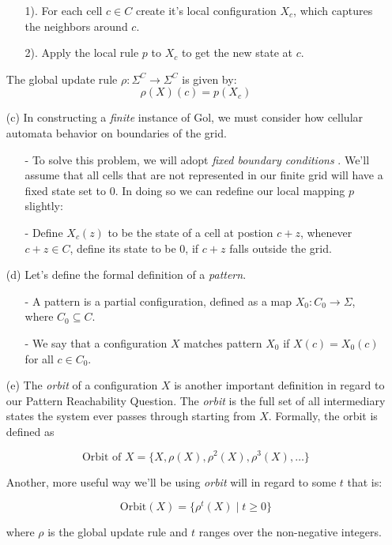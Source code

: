 \documentclass{article}
\theoremstyle{definition}
\theoremstyle{plain}
\theoremstyle{plain}
\begin{document}
\begin{enumerate}
        \begin{enumerate}
          \item[1).] For each cell $c \in C$ create it's local configuration $X_c$, which captures the neighbors around $c$.
          \item[2).] Apply the local rule $p$ to $X_c$ to get the new state at $c$.
        \end{enumerate}
        The global update rule $\rho : \Sigma^C \to \Sigma^C$ is  given by:
        \begin {equation}
        \rho(X)(c) = p(X_c)
        \end {equation}
      \item[(c)] In constructing a \textit{finite} instance of Gol, we must consider how cellular automata behavior on boundaries of the grid.
        \begin{enumerate}
          \item[-] To solve this problem, we will adopt \textit{fixed boundary conditions} \cite{SUTNER199587}. We'll assume that all cells that are not represented in our finite grid will have a fixed state set to $0$. In doing so we can redefine our local mapping $p$ slightly: 
          \item[-] Define $X_c(z)$ to be the state of a cell at postion $c + z$, whenever $c + z \in C$, define its state to be 0, if $c + z$ falls outside the grid.
        \end{enumerate}
      \item[(d)] Let's define the formal definition of a \textit{pattern}. \cite{SUTNER199587}
        \begin{enumerate}
           \item[-] A pattern is a partial configuration, defined as a map $X_0: C_0 \to \Sigma$, where $C_0 \subseteq C$.
    \item[-] We say that a configuration $X$ matches pattern $X_0$ if $X(c) = X_0(c)$ for all $c \in C_0$.
        \end{enumerate}

\item[(e)] The \textit{orbit} of a configuration $X$ is another important definition in regard to our Pattern Reachability Question. The \textit{orbit} is the full set of all intermediary states the system ever passes through starting from $X$. Formally, the orbit is defined as

\begin{equation}
  \text{Orbit of } X = \{ X, \rho(X), \rho^2(X), \rho^3(X), \dots \}
\end{equation}

Another, more useful way we'll be using \textit{orbit} will in regard to some $t$ that is: 

\begin{equation}
\text{Orbit}(X) = \{ \rho^t(X) \mid t \geq 0 \}
\end{equation}

where \( \rho \) is the global update rule and \( t \) ranges over the non-negative integers.
\end{enumerate}
\end{document}
